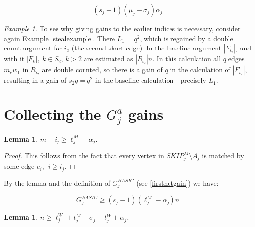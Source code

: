\documentclass{amsart}
\newtheorem{lemma}[theorem]{Lemma}
\theoremstyle{remark}
\newtheorem{example}[theorem]{Example}
\newcommand{\lijm}{\ell_{j}^M}
\newcommand{\ljm}{{\ell}_{j}^M}
\newcommand{\ljw}{{\ell}_{j}^W}
\newcommand{\tmj}{t^M_j}
\newcommand{\twj}{t^W_j}
\begin{document}
 \begin{equation}\label{doublecountingAj} (s_j-1)(\mu_j-\sigma_j)\alpha_j
 \end{equation}









 \begin{example} To see why giving gains to the earlier indices is necessary, consider again Example \ref{stealexample}.
    There $L_1=q^2$, which is regained by a double count argument for $i_2$ (the second short edge).
In the baseline argument  $|F_{i_2}|$, and with it $|F_k|,~k \in S_2$, $k>2$ are estimated as $|R_{i_2}|n$. In this calculation all $q$ edges $m_cw_1$ in $R_{i_2}$ are double counted, so there is a gain of $q$ in the calculation of $|F_{i_2}|$, resulting in a gain of $s_2q=q^2$ in the baseline calculation - precisely $L_1$.

\end{example}





\section{Collecting the $G^a_j$ gains}














 \begin{lemma}\label{lowerboundongain}
$m-i_j \ge \ljm-\alpha_j$.
\end{lemma}

\begin{proof}
This follows from the fact that every vertex in ${SKIP}^M_j \setminus A_j$  is matched by some
edge $e_i,~~i \ge i_j$.
\end{proof}


 By the lemma and the definition of $G^{BASIC}_j$  (see \eqref{firstnetgain}) we have:

\begin{equation} \label{netgainfornow} G^{BASIC}_j \ge (s_j-1)( \lijm -\alpha_j)n \end{equation}

\begin{lemma}\label{nistheking}
$n \ge \ljw+\tmj+\sigma_j+\twj+\alpha_j$.
\end{lemma}
\end{document}
